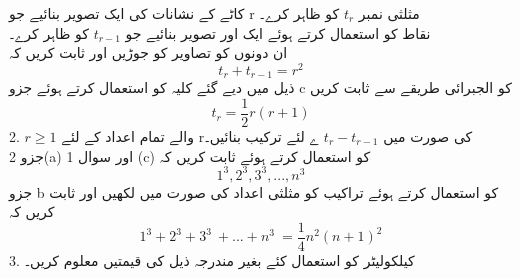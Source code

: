 کاٹے کے نشانات کی ایک تصویر بنائیے جو r مثلثی نمبر
 \(t_{r}\)
  کو ظاہر کرے۔\\
نقاط کو استعمال کرتے ہوئے ایک اور تصویر بنائیے جو
 \(t_{r-1}\)
  کو ظاہر کرے۔\\
ان دونوں کو تصاویر کو جوڑیں اور ثابت کریں کہ\\
\[ t_{r} + t_{r-1} = r^{2}\]
ذیل میں دیے گئے کلیہ کو استعمال کرتے ہوئے جزو c کو الجبرائی طریقے سے ثابت کریں\\
\[t_{r}= \frac{1}{2}r(r+ 1)\]
2.
\(r\ge1\)
والے تمام اعداد کے لئے rکی صورت میں 
\(t_{r}-t_{r-1}\)
ے لئے ترکیب بنائیں۔\\
جزو 
2(a)
اور سوال 1 
(c)
کو استعمال کرتے ہوئے ثابت کریں کہ\\

\[ 1^{3} , 2^{3} , 3^{3} , ... , n^{3}\]
جزو b کو استعمال کرتے ہوئے تراکیب کو مثلثی اعداد کی صورت میں لکھیں اور ثابت کریں کہ\\
\[ 1^{3} + 2^{3} + 3^{3}\ + ... + n^{3}\ = \frac{1}{4}n^{2}(n + 1)^{2} \]
3.
کیلکولیٹر کو استعمال کئے بغیر مندرجہ ذیل کی قیمتیں معلوم کریں۔\\

